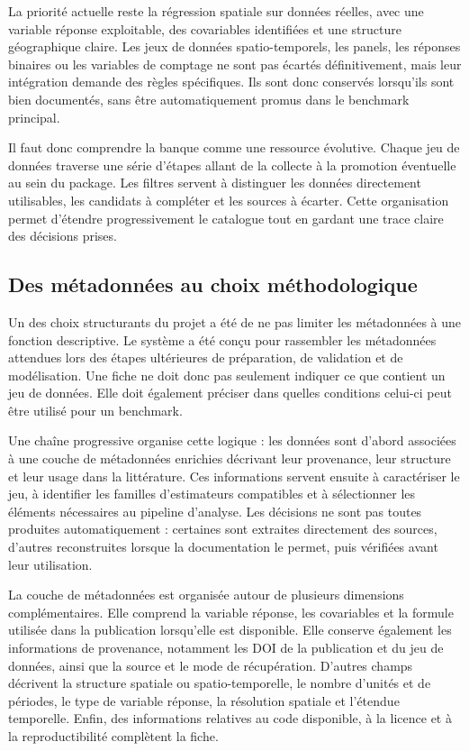 \documentclass[11pt,a4paper]{article}
\begin{document}
La priorité actuelle reste la régression spatiale sur données réelles, avec une variable réponse exploitable, des covariables identifiées et une structure géographique claire. Les jeux de données spatio-temporels, les panels, les réponses binaires ou les variables de comptage ne sont pas écartés définitivement, mais leur intégration demande des règles spécifiques. Ils sont donc conservés lorsqu'ils sont bien documentés, sans être automatiquement promus dans le benchmark principal.

Il faut donc comprendre la banque comme une ressource évolutive. Chaque jeu de données traverse une série d'étapes allant de la collecte à la promotion éventuelle au sein du package. Les filtres servent à distinguer les données directement utilisables, les candidats à compléter et les sources à écarter. Cette organisation permet d'étendre progressivement le catalogue tout en gardant une trace claire des décisions prises.

\subsection{Des métadonnées au choix méthodologique}

Un des choix structurants du projet a été de ne pas limiter les métadonnées à une fonction descriptive. Le système a été conçu pour rassembler les métadonnées attendues lors des étapes ultérieures de préparation, de validation et de modélisation. Une fiche ne doit donc pas seulement indiquer ce que contient un jeu de données. Elle doit également préciser dans quelles conditions celui-ci peut être utilisé pour un benchmark.

Une chaîne progressive organise cette logique : les données sont d'abord associées à une couche de métadonnées enrichies décrivant leur provenance, leur structure et leur usage dans la littérature. Ces informations servent ensuite à caractériser le jeu, à identifier les familles d'estimateurs compatibles et à sélectionner les éléments nécessaires au pipeline d'analyse. Les décisions ne sont pas toutes produites automatiquement : certaines sont extraites directement des sources, d'autres reconstruites lorsque la documentation le permet, puis vérifiées avant leur utilisation.

La couche de métadonnées est organisée autour de plusieurs dimensions complémentaires. Elle comprend la variable réponse, les covariables et la formule utilisée dans la publication lorsqu'elle est disponible. Elle conserve également les informations de provenance, notamment les DOI de la publication et du jeu de données, ainsi que la source et le mode de récupération. D'autres champs décrivent la structure spatiale ou spatio-temporelle, le nombre d'unités et de périodes, le type de variable réponse, la résolution spatiale et l'étendue temporelle. Enfin, des informations relatives au code disponible, à la licence et à la reproductibilité complètent la fiche.
\end{document}
